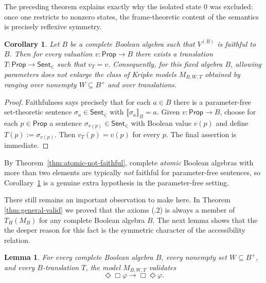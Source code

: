 \documentclass[11pt]{amsart}
\theoremstyle{definition}
\theoremstyle{plain}
\newtheorem{lemma}[definition]{Lemma}
\newtheorem{corollary}[definition]{Corollary}
\newcommand{\Prop}{\mathsf{Prop}}
\newcommand{\Sent}{\mathsf{Sent}}
\newcommand{\KTB}{\mathsf{KTB}}
\begin{document}
The preceding theorem explains exactly why the isolated state $0$ was excluded: once one restricts
to nonzero states, the frame-theoretic content of the semantics is precisely reflexive symmetry.

\begin{corollary}\label{cor:faithfulness-parameter-free}
Let $B$ be a complete Boolean algebra such that $V^{(B)}$ is faithful to $B$.
Then for every valuation $v:\Prop\to B$ there exists a translation
$T:\Prop\to\Sent_{\in}$ such that $v_T=v$.
Consequently, for this fixed algebra $B$, allowing parameters does not enlarge the class of Kripke
models $M_{B,W,T}$ obtained by ranging over nonempty $W\subseteq B^+$ and over translations.
\end{corollary}

\begin{proof}
Faithfulness says precisely that for each $a\in B$ there is a parameter-free set-theoretic sentence
$\sigma_a\in\Sent_{\in}$ with $\llbracket \sigma_a\rrbracket_B=a$. Given $v:\Prop\to B$, choose for each
$p\in\Prop$ a sentence $\sigma_{v(p)}\in\Sent_{\in}$ with Boolean value $v(p)$ and define
$T(p):=\sigma_{v(p)}$. Then $v_T(p)=v(p)$ for every $p$.
The final assertion is immediate.
\end{proof}

By Theorem~\ref{thm:atomic-not-faithful}, complete \emph{atomic} Boolean algebras with more than two elements are
typically \emph{not} faithful for parameter-free sentences, so Corollary~\ref{cor:faithfulness-parameter-free} is a genuine
extra hypothesis in the parameter-free setting.

\medskip

There still remains an important observation to make here.  In Theorem \ref{thm:general-valid} we proved that the axioms (.2) is always a member of $T_H(M_B)$ for any complete Boolean algebra $B$. 
The next lemma shows that the the deeper reason for this fact is the symmetric character of the accessibility relation.  



\begin{lemma}\label{lem:dot2-completeness-class}
For every complete Boolean algebra $B$, every nonempty set $W\subseteq B^+$, and every
$B$-translation $T$, the model $M_{B,W,T}$ validates
\[
\Diamond\Box\varphi \to \Box\Diamond\varphi.
\]
\end{lemma}
\end{document}
